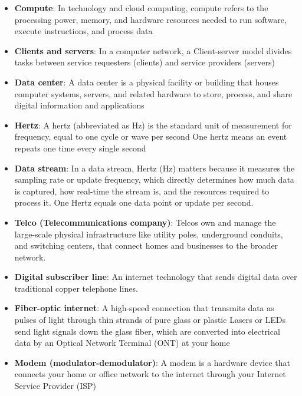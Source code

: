 \documentclass{report}
\begin{document}
\begin{itemize}
            \bigbreak \noindent 
            Software abstracts physical hardware into virtual pools of resources like Virtual Private Clouds (VPCs) and virtual routers.
        \item \textbf{Compute}: In technology and cloud computing, compute refers to the processing power, memory, and hardware resources needed to run software, execute instructions, and process data
        \item \textbf{Clients and servers}: In a computer network, a Client-server model divides tasks between service requesters (clients) and service providers (servers)
        \item \textbf{Data center}: A data center is a physical facility or building that houses computer systems, servers, and related hardware to store, process, and share digital information and applications
        \item \textbf{Hertz}: A hertz (abbreviated as Hz) is the standard unit of measurement for frequency, equal to one cycle or wave per second
            \bigbreak \noindent 
            One hertz means an event repeats one time every single second
        \item \textbf{Data stream}: In a data stream, Hertz (Hz) matters because it measures the sampling rate or update frequency, which directly determines how much data is captured, how real-time the stream is, and the resources required to process it. 
            \bigbreak \noindent 
            One Hertz equals one data point or update per second.
        \item \textbf{Telco (Telecommunications company)}:  Telcos own and manage the large-scale physical infrastructure like utility poles, underground conduits, and switching centers, that connect homes and businesses to the broader network.
        \item \textbf{Digital subscriber line}: An internet technology that sends digital data over traditional copper telephone lines.
        \item \textbf{Fiber-optic internet}:  A high-speed connection that transmits data as pulses of light through thin strands of pure glass or plastic
            \bigbreak \noindent 
            Lasers or LEDs send light signals down the glass fiber, which are converted into electrical data by an Optical Network Terminal (ONT) at your home
        \item \textbf{Modem (modulator-demodulator)}: A modem is a hardware device that connects your home or office network to the internet through your Internet Service Provider (ISP)

\end{itemize}
\end{document}
